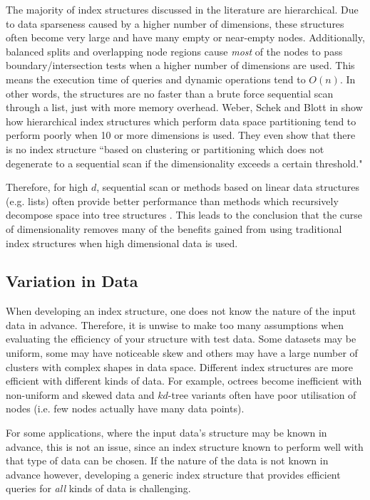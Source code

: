 The majority of index structures discussed in the literature are hierarchical. Due to data sparseness caused by a higher number of dimensions, these structures often become very large and have many empty or near-empty nodes. Additionally, balanced splits and overlapping node regions cause \textit{most} of the nodes to pass boundary/intersection tests when a higher number of dimensions are used. This means the execution time of queries and dynamic operations tend to $O(n)$. In other words, the structures are no faster than a brute force sequential scan through a list, just with more memory overhead. Weber, Schek and Blott in \cite{va-file} show how hierarchical index structures which perform data space partitioning tend to perform poorly when 10 or more dimensions is used. They even show that there is no index structure ``based on clustering or partitioning which does not degenerate to a sequential scan if the dimensionality exceeds a certain threshold."

Therefore, for high $d$, sequential scan or methods based on linear data structures (e.g. lists) often provide better performance than methods which recursively decompose space into tree structures \cite{md-structures-samet}. This leads to the conclusion that the curse of dimensionality removes many of the benefits gained from using traditional index structures when high dimensional data is used.

\subsection{Variation in Data}

When developing an index structure, one does not know the nature of the input data in advance. Therefore, it is unwise to make too many assumptions when evaluating the efficiency of your structure with test data. Some datasets may be uniform, some may have noticeable skew and others may have a large number of clusters with complex shapes in data space. Different index structures are more efficient with different kinds of data. For example, octrees become inefficient with non-uniform and skewed data and $kd$-tree variants often have poor utilisation of nodes \cite{bkd-tree} (i.e. few nodes actually have many data points).

For some applications, where the input data's structure may be known in advance, this is not an issue, since an index structure known to perform well with that type of data can be chosen. If the nature of the data is not known in advance however, developing a generic index structure that provides efficient queries for \textit{all} kinds of data is challenging.


